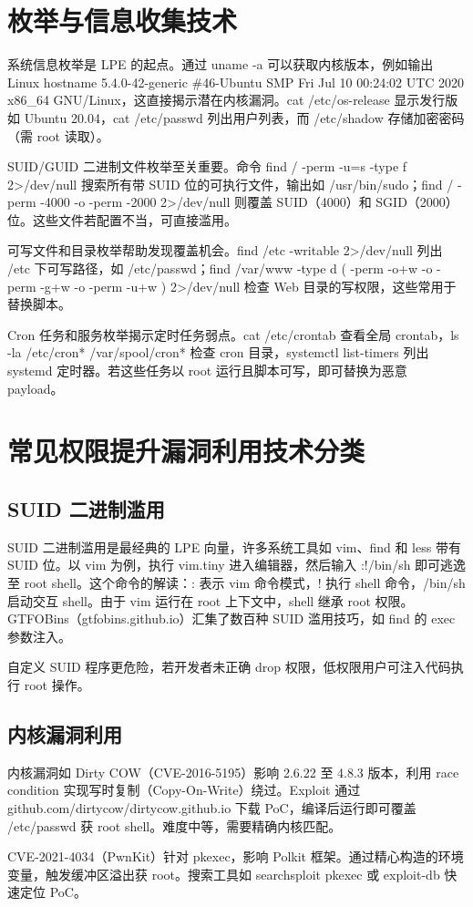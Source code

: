 \chapter{枚举与信息收集技术}
系统信息枚举是 LPE 的起点。通过 uname -a 可以获取内核版本，例如输出 Linux hostname 5.4.0-42-generic \#{}46-Ubuntu SMP Fri Jul 10 00:24:02 UTC 2020 x86\_{}64 GNU/Linux，这直接揭示潜在内核漏洞。cat /etc/os-release 显示发行版如 Ubuntu 20.04，cat /etc/passwd 列出用户列表，而 /etc/shadow 存储加密密码（需 root 读取）。\par
SUID/GUID 二进制文件枚举至关重要。命令 find / -perm -u=s -type f 2>/dev/null 搜索所有带 SUID 位的可执行文件，输出如 /usr/bin/sudo；find / -perm -4000 -o -perm -2000 2>/dev/null 则覆盖 SUID（4000）和 SGID（2000）位。这些文件若配置不当，可直接滥用。\par
可写文件和目录枚举帮助发现覆盖机会。find /etc -writable 2>/dev/null 列出 /etc 下可写路径，如 /etc/passwd；find /var/www -type d ( -perm -o+w -o -perm -g+w -o -perm -u+w ) 2>/dev/null 检查 Web 目录的写权限，这些常用于替换脚本。\par
Cron 任务和服务枚举揭示定时任务弱点。cat /etc/crontab 查看全局 crontab，ls -la /etc/cron* /var/spool/cron* 检查 cron 目录，systemctl list-timers 列出 systemd 定时器。若这些任务以 root 运行且脚本可写，即可替换为恶意 payload。\par
\chapter{常见权限提升漏洞利用技术分类}
\section{SUID 二进制滥用}
SUID 二进制滥用是最经典的 LPE 向量，许多系统工具如 vim、find 和 less 带有 SUID 位。以 vim 为例，执行 vim.tiny 进入编辑器，然后输入 :!/bin/sh 即可逃逸至 root shell。这个命令的解读：: 表示 vim 命令模式，! 执行 shell 命令，/bin/sh 启动交互 shell。由于 vim 运行在 root 上下文中，shell 继承 root 权限。GTFOBins（gtfobins.github.io）汇集了数百种 SUID 滥用技巧，如 find 的 exec 参数注入。\par
自定义 SUID 程序更危险，若开发者未正确 drop 权限，低权限用户可注入代码执行 root 操作。\par
\section{内核漏洞利用}
内核漏洞如 Dirty COW（CVE-2016-5195）影响 2.6.22 至 4.8.3 版本，利用 race condition 实现写时复制（Copy-On-Write）绕过。Exploit 通过 github.com/dirtycow/dirtycow.github.io 下载 PoC，编译后运行即可覆盖 /etc/passwd 获 root shell。难度中等，需要精确内核匹配。\par
CVE-2021-4034（PwnKit）针对 pkexec，影响 Polkit 框架。通过精心构造的环境变量，触发缓冲区溢出获 root。搜索工具如 searchsploit pkexec 或 exploit-db 快速定位 PoC。\par
